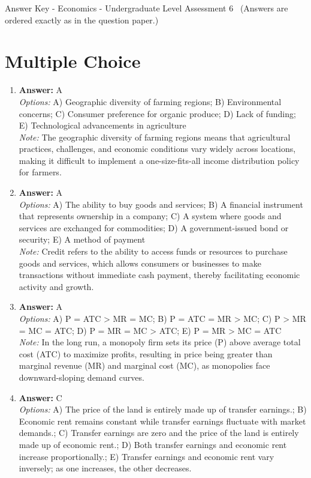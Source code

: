 \documentclass[12pt]{article}
\begin{document}
\begin{center}
Answer Key - Economics - Undergraduate Level Assessment 6 \
\small (Answers are ordered exactly as in the question paper.)
\end{center}

\section*{Multiple Choice}
\begin{enumerate}[label=\arabic*.]
\item \textbf{Answer:} A
\\ \textit{Options:} A) Geographic diversity of farming regions; B) Environmental concerns; C) Consumer preference for organic produce; D) Lack of funding; E) Technological advancements in agriculture
\\ \textit{Note:} The geographic diversity of farming regions means that agricultural practices, challenges, and economic conditions vary widely across locations, making it difficult to implement a one-size-fits-all income distribution policy for farmers.
\item \textbf{Answer:} A
\\ \textit{Options:} A) The ability to buy goods and services; B) A financial instrument that represents ownership in a company; C) A system where goods and services are exchanged for commodities; D) A government-issued bond or security; E) A method of payment
\\ \textit{Note:} Credit refers to the ability to access funds or resources to purchase goods and services, which allows consumers or businesses to make transactions without immediate cash payment, thereby facilitating economic activity and growth.
\item \textbf{Answer:} A
\\ \textit{Options:} A) P = ATC \textgreater{} MR = MC; B) P = ATC = MR \textgreater{} MC; C) P \textgreater{} MR = MC = ATC; D) P = MR = MC \textgreater{} ATC; E) P = MR \textgreater{} MC = ATC
\\ \textit{Note:} In the long run, a monopoly firm sets its price (P) above average total cost (ATC) to maximize profits, resulting in price being greater than marginal revenue (MR) and marginal cost (MC), as monopolies face downward-sloping demand curves.
\item \textbf{Answer:} C
\\ \textit{Options:} A) The price of the land is entirely made up of transfer earnings.; B) Economic rent remains constant while transfer earnings fluctuate with market demands.; C) Transfer earnings are zero and the price of the land is entirely made up of economic rent.; D) Both transfer earnings and economic rent increase proportionally.; E) Transfer earnings and economic rent vary inversely; as one increases, the other decreases.

\end{enumerate}
\end{document}
